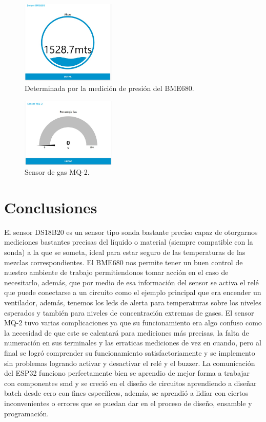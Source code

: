\documentclass[10pt,twocolumn,letterpaper]{article}
\begin{document}
\begin{Abstract}
\begin{figure}
  \centering
  \includegraphics[width=0.4\textwidth]{Altura.jpg}
  \caption{Determinada por la medición de presión del BME680.}
\end{figure}

\begin{figure}
  \centering
  \includegraphics[width=0.4\textwidth]{Gas.jpg}
  \caption{Sensor de gas MQ-2.}
\end{figure}

\section*{Conclusiones}
El sensor DS18B20 es un sensor tipo sonda bastante preciso capaz de otorgarnos mediciones bastantes precisas del líquido o material (siempre compatible con la sonda) a la que se someta, ideal para estar seguro de las temperaturas de las mezclas correspondientes. El BME680 nos permite tener un buen control de nuestro ambiente de trabajo permitiendonos tomar acción en el caso de necesitarlo, además, que por medio de esa información del sensor se activa el relé que puede conectarse a un circuito como el ejemplo principal que era encender un ventilador, además,  tenemos los leds de alerta para temperaturas sobre los niveles esperados y también para niveles de concentración extremas de gases. El sensor MQ-2 tuvo varias complicaciones ya que su funcionamiento era algo confuso como la necesidad de que este se calentará para mediciones más precisas, la falta de numeración en sus terminales y las erraticas mediciones de vez en cuando, pero al final se logró comprender su funcionamiento satisfactoriamente y se implemento sin problemas logrando activar y desactivar el relé y el buzzer. La comunicación del ESP32 funciono perfectamente bien se aprendio de mejor forma a trabajar con componentes smd y se creció en el diseño de circuitos aprendiendo a diseñar batch desde cero con fines específicos, además, se aprendió a lidiar con ciertos inconvenientes o errores que se puedan dar en el proceso de diseño, ensamble y programación.


\end{Abstract}
\end{document}
